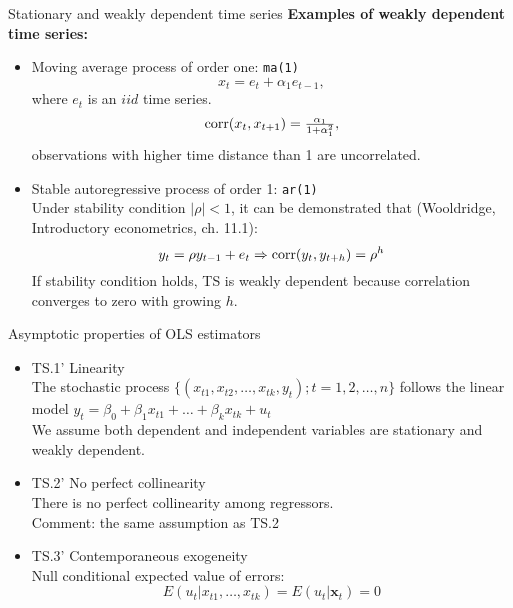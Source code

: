 \documentclass{beamer}
\begin{document}
\begin{frame}{Stationary and weakly dependent time series}
\textbf{Examples of weakly dependent time series:}
\bigskip
\begin{itemize}
\item Moving average process of order one: \texttt{ma(1)}
$$x_t=e_t+\alpha_1 e_{t-1},$$
where $e_t$ is an $\textit{iid}$ time series.\\ $$\textnormal{corr}(x_t,x_{t+1})=\tfrac{\alpha_1}{1+\alpha_1^2},$$ observations with higher time distance than 1 are uncorrelated.

\bigskip

\item Stable autoregressive process of order 1: \texttt{ar(1)}\\
\medskip
Under stability condition $|\rho|<1$, it can be demonstrated that (Wooldridge, Introductory econometrics, ch. 11.1):
$$y_t=\rho y_{t-1} + e_t \Rightarrow \textnormal{corr}(y_t,y_{t+h})=\rho^h$$
If stability condition holds, TS is weakly dependent because correlation converges  to zero with growing $h$.
\end{itemize}

\end{frame}


\begin{frame}{Asymptotic properties of OLS estimators}
\begin{itemize}
\item TS.1' Linearity \\The stochastic process 
$\{(x_{t1},x_{t2},\dots,x_{tk},y_t);t=1,2,\dots, n\}$ follows the linear model $ y_t = \beta_0 + \beta_1 x_{t1} + \dots + \beta_k x_{tk}+u_t$ 
\\ \vspace{0.1cm} We assume both dependent and independent variables are stationary and weakly dependent.
\vspace{0.5cm}
\item TS.2' No perfect collinearity \\
There is no perfect collinearity among regressors. \\
{\footnotesize Comment: the same assumption as TS.2}
\vspace{0.5cm}
\item TS.3' Contemporaneous exogeneity 
\\Null conditional expected value of errors: 
$$E(u_t|x_{t1},\dots,x_{tk})=E(u_t|\boldsymbol{x}_t)=0$$
\end{itemize}
\end{frame}
\end{document}
